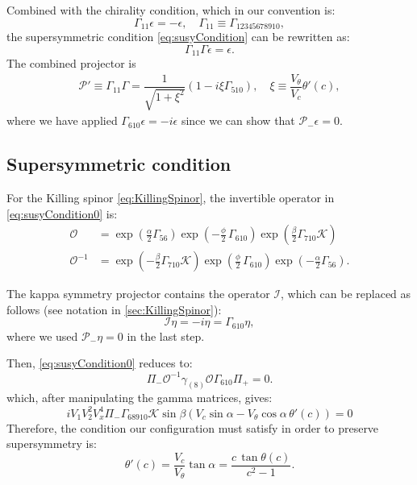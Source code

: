 Combined with the chirality condition, which in our convention is: 
\begin{equation}
 \Gamma_{11} \epsilon = -\epsilon, \quad 
 \Gamma_{11} \equiv \Gamma_{12345678910},
\end{equation}
the supersymmetric condition \eqref{eq:susyCondition} can be rewritten as:
\begin{equation}
 \Gamma_{11} \Gamma \epsilon = \epsilon.
\end{equation}
The combined projector is
\begin{align} \label{eq:newProjector}
  \mathcal{P}' \equiv \Gamma_{11} \Gamma  = \dfrac{1}{\sqrt{1+\xi^2}}(1- i \xi  \Gamma_{510}), \quad 
   \xi \equiv  \dfrac{V_\theta}{V_c} \theta'(c),
\end{align}
where we have applied $\Gamma_{610} \epsilon = -i \epsilon$ since we can show that $\mathcal{P}_- \epsilon =0$. 



\subsection{Supersymmetric condition}

For the Killing spinor \eqref{eq:KillingSpinor}, the invertible operator in \eqref{eq:susyCondition0} is:
\begin{align}
 \mathcal{O} &= \exp{\left(\frac{\alpha}{2}\Gamma_{56} \right)} \exp{\left(-\frac{\phi}{2}\, \Gamma_{610} \right)} \exp{\left(\frac{\beta}{2}\Gamma_{710} \mathcal{K} \right)} \\
 \mathcal{O}^{-1} &=  \exp{\left(-\frac{\beta}{2}\Gamma_{710} \mathcal{K} \right)} 
 \exp{\left(\frac{\phi}{2}\, \Gamma_{610} \right)} 
 \exp{\left(-\frac{\alpha}{2}\Gamma_{56} \right)}.
\end{align}


The kappa symmetry projector contains the operator $\mathcal{I}$, which can be replaced as follows (see notation in \ref{sec:KillingSpinor}):
\begin{equation}
 \mathcal{I}\eta =-i \eta = \Gamma_{610} \eta,
\end{equation}
where we used $\mathcal{P}_- \eta =0$ in the last step. 

Then, \eqref{eq:susyCondition0} reduces to:
\begin{equation}
 \Pi_{-} \mathcal{O}^{-1} \gamma_{(8)} \mathcal{O} \Gamma_{610} \Pi_{+}  = 0.
\end{equation}
which, after manipulating the gamma matrices, gives:
\begin{equation}
i V_1 V_2^2 V_x^4 \Pi_- \Gamma_{6 8 9 10} \mathcal{K} \sin\beta \left(V_c \sin\alpha - V_\theta \cos\alpha \, \theta'(c)\right) = 0
\end{equation}
Therefore, the condition our configuration must satisfy in order to preserve supersymmetry is:
\begin{equation}\label{eq:susyConditionTheta}
 \theta'(c) = \dfrac{V_c}{V_\theta} \tan\alpha = \dfrac{c \, \tan\theta(c)}{c^2-1} .
\end{equation}


